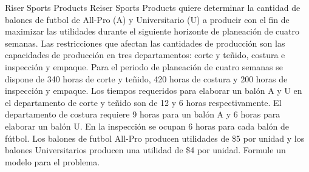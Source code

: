 \begin{frameact}{Riser Sports Products}{}
  Reiser Sports Products quiere determinar la cantidad de balones de futbol de All-Pro (A)
y Universitario (U) a producir con el ﬁn de maximizar las utilidades durante el siguiente horizonte de planeación de cuatro semanas. Las restricciones que afectan las cantidades de
producción son las capacidades de producción en tres departamentos: corte y teñido, costura
e inspección y empaque. Para el periodo de planeación de cuatro semanas se dispone de 340 horas de corte y teñido, 420 horas de costura y 200 horas de inspección y empaque. Los tiempos requeridos para elaborar un balón A y U en el departamento de corte y teñido son de 12 y 6 horas respectivamente. El departamento de costura requiere 9 horas para un balón A y 6 horas para elaborar un balón U. En la inspección se ocupan 6 horas para cada balón de fútbol. Los balones de futbol All-Pro producen utilidades de \$5 por unidad y los balones Universitarios producen una utilidad de \$4 por unidad. Formule un modelo para el problema.
\end{frameact}



